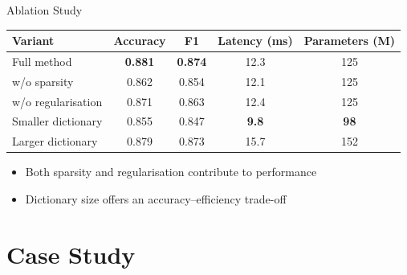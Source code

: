 \documentclass{beamer}
\begin{document}
\begin{frame}{Ablation Study}
    \centering
    \scriptsize
    \begin{tabular}{lcccc}
        \toprule
        \textbf{Variant} & \textbf{Accuracy} & \textbf{F1} & \textbf{Latency (ms)} & \textbf{Parameters (M)} \\
        \midrule
        Full method          & \textbf{0.881} & \textbf{0.874} & 12.3 & 125  \\
        w/o sparsity         & 0.862 & 0.854 & 12.1 & 125  \\
        w/o regularisation   & 0.871 & 0.863 & 12.4 & 125  \\
        Smaller dictionary   & 0.855 & 0.847 & \textbf{9.8}  & \textbf{98}   \\
        Larger dictionary    & 0.879 & 0.873 & 15.7 & 152  \\
        \bottomrule
    \end{tabular}
    \vspace{0.3cm}
    \normalsize
    \begin{itemize}
        \item Both sparsity and regularisation contribute to performance
        \item Dictionary size offers an accuracy--efficiency trade-off
    \end{itemize}
\end{frame}

\section[Case Study]{Case Study}
\end{document}
